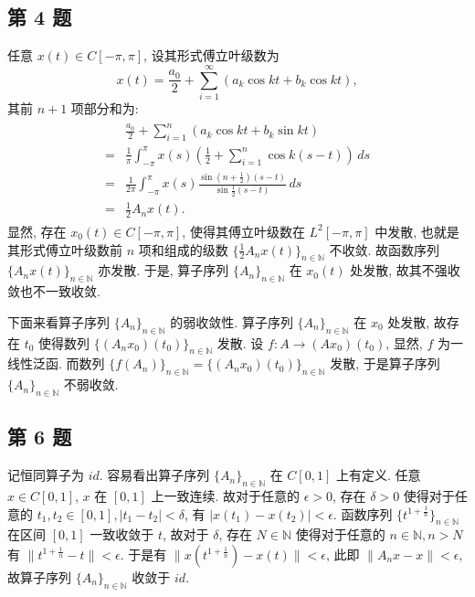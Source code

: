 \documentclass[../main.tex]{subfiles}
\begin{document}
\subsection{第 4 题}
任意 $x(t) \in C[-\pi, \pi]$, 设其形式傅立叶级数为
\[
    x(t) = \frac{a_0}{2} + \sum_{i = 1}^{\infty}(a_k \cos{kt} + b_k \cos{kt}),
\]
其前 $n + 1$ 项部分和为:
\begin{align}
    \begin{split} \label{eq:1}
         & \frac{a_0}{2} + \sum_{i = 1}^{n}(a_k \cos kt + b_k \sin kt) \\
        =& \frac{1}{\pi} \int_{-\pi}^{\pi} x(s)(\frac{1}{2} + \sum_{i = 1}^{n} \cos k(s - t)) \, ds \\
        =& \frac{1}{2 \pi} \int_{-\pi}^{\pi} x(s) \frac{\sin (n + \frac{1}{2})(s - t)}{\sin \frac{1}{2}(s - t)} \, ds \\
        =& \frac{1}{2} A_n x(t).
    \end{split}
\end{align}
显然, 存在 $x_0(t) \in C[-\pi, \pi]$,
使得其傅立叶级数在 $L^2 [-\pi, \pi]$ 中发散,
也就是其形式傅立叶级数前 $n$ 项和组成的级数 $\{ \frac{1}{2} A_n x(t) \}_{n \in \mathbb{N}}$ 不收敛.
故函数序列 $\{ A_n x(t) \}_{n \in \mathbb{N}}$ 亦发散.
于是, 算子序列 $\{ A_n \}_{n \in \mathbb{N}}$ 在 $x_0(t)$ 处发散,
故其不强收敛也不一致收敛.

下面来看算子序列 $\{ A_n \}_{n \in \mathbb{N}}$ 的弱收敛性.
算子序列 $\{ A_n \}_{n \in \mathbb{N}}$ 在 $x_0$ 处发散,
故存在 $t_0$ 使得数列 $\{ (A_n x_0)(t_0) \}_{n \in \mathbb{N}}$ 发散.
设 $f: A \to (A x_0)(t_0)$, 显然, $f$ 为一线性泛函.
而数列 $\{ f(A_n) \}_{n \in \mathbb{N}} = \{ (A_n x_0)(t_0) \}_{n \in \mathbb{N}}$ 发散,
于是算子序列 $\{ A_n \}_{n \in \mathbb{N}}$ 不弱收敛.

\subsection{第 6 题}
记恒同算子为 $id$.
容易看出算子序列 $\{ A_{n} \}_{n \in \mathbb{N}}$ 在 $C[0, 1]$ 上有定义.
任意 $x \in C[0, 1]$, $x$ 在 $[0,1]$ 上一致连续.
故对于任意的 $\epsilon > 0$,
存在 $\delta > 0$ 使得对于任意的 $t_1, t_2 \in [0, 1], | t_1 - t_2| < \delta$,
有 $| x(t_1) - x(t_2) | < \epsilon$.
函数序列 $\{ t^{1 + \frac{1}{n}} \}_{n \in \mathbb{N}}$ 在区间 $[0, 1]$ 一致收敛于 $t$,
故对于 $\delta$, 存在 $N \in \mathbb{N}$ 使得对于任意的 $n \in \mathbb{N}, n > N$ 有 $\| t^{1 + \frac{1}{n}} - t \| < \epsilon$.
于是有 $\| x(t^{1 + \frac{1}{n}}) - x(t) \| < \epsilon$,
此即 $\| A_n x - x \| < \epsilon$, 故算子序列 $\{ A_{n} \}_{n \in \mathbb{N}}$ 收敛于 $id$.
\end{document}
